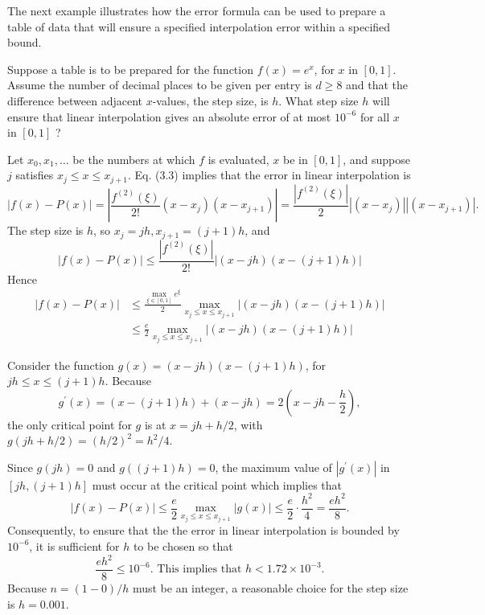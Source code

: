 The next example illustrates how the error formula can be used to prepare a table of data that will ensure a specified interpolation error within a specified bound.

\begin{example}
Suppose a table is to be prepared for the function $f(x)=e^{x}$, for $x$ in $[0,1]$. Assume the number of decimal places to be given per entry is $d \geq 8$ and that the difference between adjacent $x$-values, the step size, is $h$. What step size $h$ will ensure that linear interpolation gives an absolute error of at most $10^{-6}$ for all $x$ in $[0,1]$ ?
\end{example}

\begin{mysolution}
Let $x_{0}, x_{1}, \ldots$ be the numbers at which $f$ is evaluated, $x$ be in $[0,1]$, and suppose $j$ satisfies $x_{j} \leq x \leq x_{j+1}$. Eq. (3.3) implies that the error in linear interpolation is
\[|f(x)-P(x)|=\left|\frac{f^{(2)}(\xi)}{2!}\left(x-x_{j}\right)\left(x-x_{j+1}\right)\right|=\frac{\left|f^{(2)}(\xi)\right|}{2}\left|\left(x-x_{j}\right)\right|\left|\left(x-x_{j+1}\right)\right|.\]
The step size is $h$, so $x_{j}=j h, x_{j+1}=(j+1) h$, and
\[|f(x)-P(x)| \leq \frac{\left|f^{(2)}(\xi)\right|}{2!}|(x-j h)(x-(j+1) h)|\]
Hence
\[\begin{aligned}
|f(x)-P(x)| & \leq \frac{\max _{\xi \in[0,1]} e^{\xi}}{2} \max _{x_{j} \leq x \leq x_{j+1}}|(x-j h)(x-(j+1) h)| \\
& \leq \frac{e}{2} \max _{x_{j} \leq x \leq x_{j+1}}|(x-j h)(x-(j+1) h)|
\end{aligned}\]

Consider the function $g(x)=(x-j h)(x-(j+1) h)$, for $j h \leq x \leq(j+1) h$. Because
\[g^{\prime}(x)=(x-(j+1) h)+(x-j h)=2\left(x-j h-\frac{h}{2}\right),\]
the only critical point for $g$ is at $x=j h+h / 2$, with $g(j h+h / 2)=(h / 2)^{2}=h^{2} / 4$.

Since $g(j h)=0$ and $g((j+1) h)=0$, the maximum value of $\left|g^{\prime}(x)\right|$ in $[j h,(j+1) h]$ must occur at the critical point which implies that
\[|f(x)-P(x)| \leq \frac{e}{2} \max _{x_{j} \leq x \leq x_{j+1}}|g(x)| \leq \frac{e}{2} \cdot \frac{h^{2}}{4}=\frac{e h^{2}}{8}.\]
Consequently, to ensure that the the error in linear interpolation is bounded by $10^{-6}$, it is sufficient for $h$ to be chosen so that
\[\frac{e h^{2}}{8} \leq 10^{-6}. \text { This implies that } h<1.72 \times 10^{-3}.\]
Because $n=(1-0) / h$ must be an integer, a reasonable choice for the step size is $h=0.001$.
\end{mysolution}
